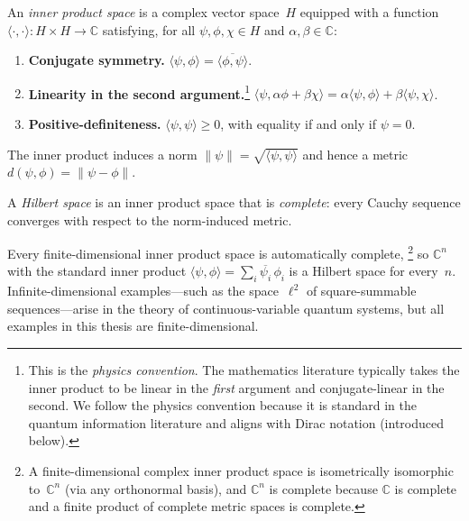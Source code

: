 \begin{definition}
\label{def:inner-product-space}
An \emph{inner product space} is a complex vector space~$H$ equipped
with a function
$\langle \cdot , \cdot \rangle : H \times H \to \mathbb{C}$
satisfying, for all $\psi, \phi, \chi \in H$ and
$\alpha, \beta \in \mathbb{C}$:
\begin{enumerate}
  \item \textbf{Conjugate symmetry.}
    $\langle \psi , \phi \rangle
    = \overline{\langle \phi , \psi \rangle}$.
  \item \textbf{Linearity in the second argument.}\footnote{This
    is the \emph{physics convention}.  The mathematics literature
    typically takes the inner product to be linear in the
    \emph{first} argument and conjugate-linear in the second.
    We follow the physics convention because it is standard in the
    quantum information literature and aligns with Dirac notation
    (introduced below).}
    $\langle \psi , \alpha\phi + \beta\chi \rangle
    = \alpha\langle \psi , \phi \rangle
      + \beta\langle \psi , \chi \rangle$.
  \item \textbf{Positive-definiteness.}
    $\langle \psi , \psi \rangle \geq 0$, with equality if and
    only if $\psi = 0$.
\end{enumerate}
The inner product induces a norm
$\|\psi\| = \sqrt{\langle \psi , \psi \rangle}$ and hence a
metric $d(\psi, \phi) = \|\psi - \phi\|$.
\end{definition}

\begin{definition}
\label{def:hilbert-space}
A \emph{Hilbert space} is an inner product space that is
\emph{complete}: every Cauchy sequence converges with respect to the
norm-induced metric.
\end{definition}

\noindent
Every finite-dimensional inner product space is automatically
complete,%
\footnote{A finite-dimensional complex inner product space is
isometrically isomorphic to~$\mathbb{C}^n$ (via any orthonormal
basis), and $\mathbb{C}^n$ is complete because $\mathbb{C}$ is
complete and a finite product of complete metric spaces is complete.}
so $\mathbb{C}^n$ with the standard inner product
$\langle \psi , \phi \rangle = \sum_i \overline{\psi_i}\,\phi_i$
is a Hilbert space for every~$n$.
Infinite-dimensional examples---such as the space~$\ell^2$ of
square-summable sequences---arise in the theory of continuous-variable
quantum systems, but all examples in this thesis are
finite-dimensional.


